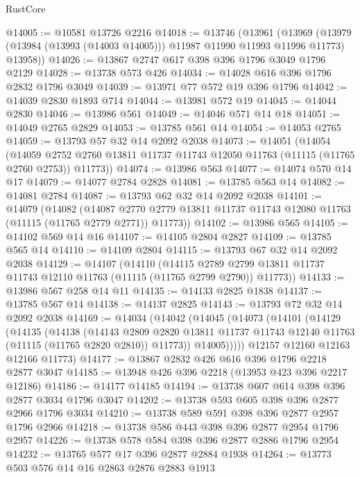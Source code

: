 \begin{lexlean}{RustCore}
\begin{coremodule}
@14005 := @10581 @13726 @2216
@14018 := @13746
    (@13961
      (@13969 (@13979 (@13984 (@13993 (@14003 @14005))) @11987 @11990 @11993 @11996 @11773) @13958))
@14026 := @13867 @2747 @617 @398 @396 @1796 @3049 @1796 @2129
@14028 := @13738 @573 @426
@14034 := @14028 @616 @396 @1796 @2832 @1796 @3049
@14039 := @13971 @77 @572 @19 @396 @1796
@14042 := @14039 @2830 @1893 @714
@14044 := @13981 @572 @19
@14045 := @14044 @2830
@14046 := @13986 @561
@14049 := @14046 @571 @14 @18
@14051 := @14049 @2765 @2829
@14053 := @13785 @561 @14
@14054 := @14053 @2765
@14059 := @13793 @57 @32 @14 @2092 @2038
@14073 := @14051
    (@14054
      (@14059 @2752 @2760 @13811 @11737 @11743 @12050 @11763 (@11115 (@11765 @2760 @2753)) @11773))
@14074 := @13986 @563
@14077 := @14074 @570 @14 @17
@14079 := @14077 @2784 @2828
@14081 := @13785 @563 @14
@14082 := @14081 @2784
@14087 := @13793 @62 @32 @14 @2092 @2038
@14101 := @14079
    (@14082
      (@14087 @2770 @2779 @13811 @11737 @11743 @12080 @11763 (@11115 (@11765 @2779 @2771)) @11773))
@14102 := @13986 @565
@14105 := @14102 @569 @14 @16
@14107 := @14105 @2804 @2827
@14109 := @13785 @565 @14
@14110 := @14109 @2804
@14115 := @13793 @67 @32 @14 @2092 @2038
@14129 := @14107
    (@14110
      (@14115 @2789 @2799 @13811 @11737 @11743 @12110 @11763 (@11115 (@11765 @2799 @2790)) @11773))
@14133 := @13986 @567 @258 @14 @11
@14135 := @14133 @2825 @1838
@14137 := @13785 @567 @14
@14138 := @14137 @2825
@14143 := @13793 @72 @32 @14 @2092 @2038
@14169 := @14034
    (@14042
      (@14045
        (@14073
          (@14101
            (@14129
              (@14135
                (@14138
                  (@14143
                    @2809
                    @2820
                    @13811
                    @11737
                    @11743
                    @12140
                    @11763
                    (@11115 (@11765 @2820 @2810))
                    @11773))
                @14005)))))
      @12157
      @12160
      @12163
      @12166
      @11773)
@14177 := @13867 @2832 @426 @616 @396 @1796 @2218 @2877 @3047
@14185 := @13948 @426 @396 @2218 (@13953 @423 @396 @2217 @12186)
@14186 := @14177 @14185
@14194 := @13738 @607 @614 @398 @396 @2877 @3034 @1796 @3047
@14202 := @13738 @593 @605 @398 @396 @2877 @2966 @1796 @3034
@14210 := @13738 @589 @591 @398 @396 @2877 @2957 @1796 @2966
@14218 := @13738 @586 @443 @398 @396 @2877 @2954 @1796 @2957
@14226 := @13738 @578 @584 @398 @396 @2877 @2886 @1796 @2954
@14232 := @13765 @577 @17 @396 @2877 @2884 @1938
@14264 := @13773
    @503
    @576
    @14
    @16
    @2863
    @2876
    @2883
    @1913

\end{coremodule}
\end{lexlean}
